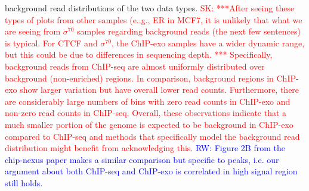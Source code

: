 \documentclass{bmcart}
\newcommand{\SK}[1]{\textcolor{red}{SK: #1}}
\newcommand{\RW}[1]{\textcolor{blue}{RW: #1}}
\newcommand{\sig}{\sigma^{70}}
\begin{document}
background read distributions of the two data types.  \SK{***After
  seeing these types of plots from other samples (e..g., ER in MCF7,
  it is unlikely that what we are seeing from $\sig$ samples regarding
  background reads (the next few sentences) is typical. For CTCF and
  $\sig$, the ChIP-exo samples have a wider dynamic range, but this
  could be due to differences in sequencing depth. *** Specifically,
  background reads from ChIP-seq are almost uniformly distributed over
  background (non-enriched) regions. In comparison, background regions
  in ChIP-exo show larger variation but have overall lower read
  counts. Furthermore, there are considerably large numbers of bins
  with zero read counts in ChIP-exo and non-zero read counts in
  ChIP-seq.
  Overall, these observations indicate that a much smaller portion of
  the genome is expected to be background in ChIP-exo compared to
  ChIP-seq and methods that specifically model the background read
  distribution might benefit from acknowledging this.} \RW{Figure 2B
  from the chip-nexus paper makes a similar comparison but specific to
  peaks, i.e. our argument about both ChIP-seq and ChIP-exo is
  correlated in high signal region still holds.}
\end{document}
